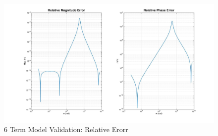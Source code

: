 \begin{figure}[ht!]
\includegraphics[keepaspectratio=true,width=6in]{./figures/regression/fullModel_testRel.jpg}
\centering
\caption{6 Term Model Validation: Relative Erorr}
\label{fig:fullModel_testRel}
\end{figure}
